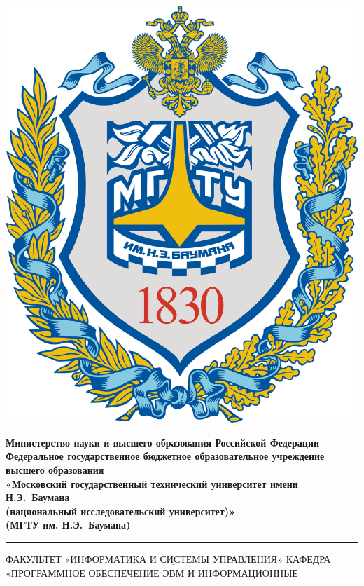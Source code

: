 \documentclass[a4paper, 12pt]{extreport}
\begin{document}
	\thispagestyle{empty}
	
	\noindent \begin{minipage}{0.15\textwidth}
		\includegraphics[width=\linewidth]{b_logo}
	\end{minipage}
	\noindent\begin{minipage}{0.85\textwidth}\centering
		\textbf{Министерство науки и высшего образования Российской Федерации}\\
		\textbf{Федеральное государственное бюджетное образовательное учреждение высшего образования}\\
		\textbf{«Московский государственный технический университет имени Н.Э.~Баумана}\\
		\textbf{(национальный исследовательский университет)»}\\
		\textbf{(МГТУ им. Н.Э.~Баумана)}
	\end{minipage}
	
	\noindent\rule{\linewidth}{3pt}
	\newline\newline
	\noindent ФАКУЛЬТЕТ $\underline{\text{«ИНФОРМАТИКА И СИСТЕМЫ УПРАВЛЕНИЯ»}}$ \newline\newline
	\noindent КАФЕДРА $\underline{\text{«ПРОГРАММНОЕ ОБЕСПЕЧЕНИЕ ЭВМ И ИНФОРМАЦИОННЫЕ ТЕХНОЛОГИИ»}}$
	
\end{document}
